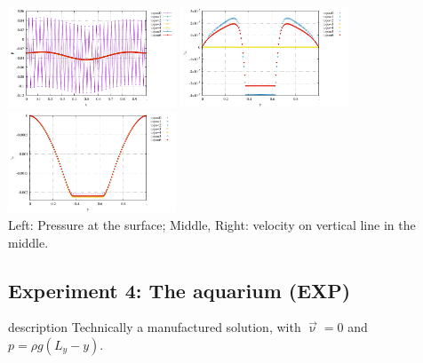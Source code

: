 \begin{center}
\includegraphics[width=5cm]{python_codes/fieldstone_78/results/pressure_top_exp3.pdf}
\includegraphics[width=5cm]{python_codes/fieldstone_78/results/vx_profile_exp3.pdf}
\includegraphics[width=5cm]{python_codes/fieldstone_78/results/vy_profile_exp3.pdf}\\
{\captionfont Left: Pressure at the surface; Middle, Right: velocity on vertical line in the middle.}
\end{center}





\newpage
\subsection*{Experiment 4: The aquarium (EXP)}

{\color{red} description}
Technically a manufactured solution, with $\vec{\upnu}=0$ and $p=\rho g (L_y-y)$.

